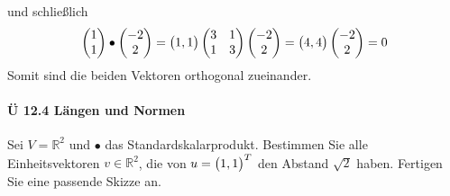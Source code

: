 \documentclass{scrreprt}
\begin{document}
\begin{enumerate}[(a)]
  und schließlich
  \[
    \begin{pmatrix}
      1 \\
      1 \\
    \end{pmatrix}
    \bullet
    \begin{pmatrix}
      -2 \\
      2  \\
    \end{pmatrix}
    =
    \qty\big(1, 1) \begin{pmatrix}
      3 & 1 \\
      1 & 3 \\
    \end{pmatrix} \begin{pmatrix}
      -2 \\
      2  \\
    \end{pmatrix}
    =
    \qty\big(4, 4) \begin{pmatrix}
      -2 \\
      2  \\
    \end{pmatrix}
    = 0
  \]
  Somit sind die beiden Vektoren orthogonal zueinander.
\end{enumerate}

\newpage
\paragraph{Ü 12.4 Längen und Normen}

Sei $V = \mathbb{R}^2$ und $\bullet$ das Standardskalarprodukt.
Bestimmen Sie alle Einheitsvektoren $v \in \mathbb{R}^2$, die von
$u = \qty\big(1, 1)^T$ den Abstand $\sqrt{2}$ haben.
Fertigen Sie eine passende Skizze an.
\end{document}
